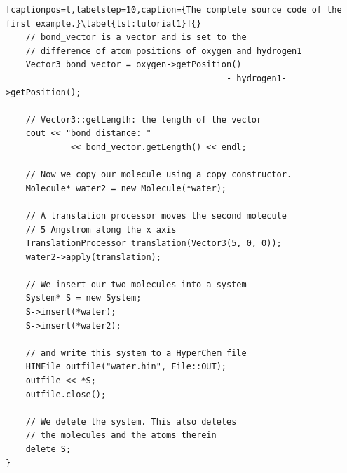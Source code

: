 \begin{lstlisting}[captionpos=t,labelstep=10,caption={The complete source code of the first example.}\label{lst:tutorial1}]{}
	// bond_vector is a vector and is set to the
	// difference of atom positions of oxygen and hydrogen1
	Vector3 bond_vector = oxygen->getPosition() 
											- hydrogen1->getPosition();

	// Vector3::getLength: the length of the vector
	cout << "bond distance: " 
			 << bond_vector.getLength() << endl;

	// Now we copy our molecule using a copy constructor.
	Molecule* water2 = new Molecule(*water);

	// A translation processor moves the second molecule
	// 5 Angstrom along the x axis
	TranslationProcessor translation(Vector3(5, 0, 0));
	water2->apply(translation);

	// We insert our two molecules into a system
	System* S = new System;
	S->insert(*water);
	S->insert(*water2);

	// and write this system to a HyperChem file
	HINFile outfile("water.hin", File::OUT);
	outfile << *S;
	outfile.close();

	// We delete the system. This also deletes 
	// the molecules and the atoms therein
	delete S;
}
\end{lstlisting}
